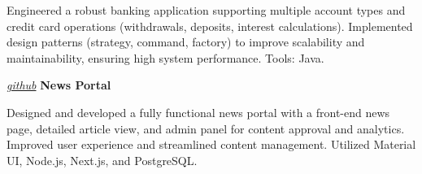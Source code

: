 \vspace{0.10 cm}
\begin{onecolentry}
    \begin{highlights}
        \item Engineered a robust banking application supporting multiple account types and credit card operations (withdrawals, deposits, interest calculations). Implemented design patterns (strategy, command, factory) to improve scalability and maintainability, ensuring high system performance. Tools: Java.
    \end{highlights}
\end{onecolentry}

\vspace{0.2 cm}

\begin{twocolentry}{
    \textit{\href{https://github.com/PrayashShrestha/newsPortal}{github}}}
    \textbf{News Portal}
\end{twocolentry}

\vspace{0.10 cm}
\begin{onecolentry}
    \begin{highlights}
        \item Designed and developed a fully functional news portal with a front-end news page, detailed article view, and admin panel for content approval and analytics. Improved user experience and streamlined content management. Utilized Material UI, Node.js, Next.js, and PostgreSQL.
    \end{highlights}
\end{onecolentry}